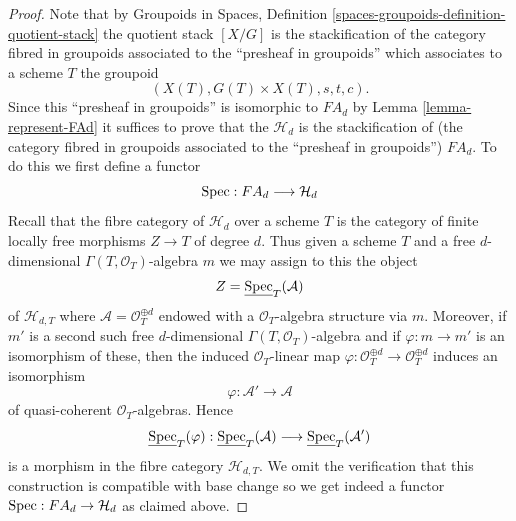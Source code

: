 \begin{proof}
Note that by
Groupoids in Spaces, Definition
\ref{spaces-groupoids-definition-quotient-stack}
the quotient stack $[X/G]$ is the stackification of the
category fibred in groupoids associated to the ``presheaf in groupoids''
which associates to a scheme $T$ the groupoid
$$
(X(T), G(T) \times X(T), s, t, c).
$$
Since this ``presheaf in groupoids'' is isomorphic to $FA_d$ by
Lemma \ref{lemma-represent-FAd}
it suffices to prove that the $\mathcal{H}_d$ is the stackification
of (the category fibred in groupoids associated to the
``presheaf in groupoids'') $FA_d$. To do this we first define a
functor
$$
\mathop{\mathrm{Spec}} : FA_d \longrightarrow \mathcal{H}_d
$$
Recall that the fibre category of $\mathcal{H}_d$ over a scheme $T$
is the category of finite locally free morphisms $Z \to T$ of degree $d$.
Thus given a scheme $T$ and a free $d$-dimensional
$\Gamma(T, \mathcal{O}_T)$-algebra $m$ we may assign to this the object
$$
Z = \underline{\mathop{\mathrm{Spec}}}_T(\mathcal{A})
$$
of $\mathcal{H}_{d, T}$
where $\mathcal{A} = \mathcal{O}_T^{\oplus d}$ endowed with a
$\mathcal{O}_T$-algebra structure via $m$. Moreover, if $m'$ is
a second such free $d$-dimensional $\Gamma(T, \mathcal{O}_T)$-algebra
and if $\varphi : m \to m'$ is an isomorphism of these, then
the induced $\mathcal{O}_T$-linear map
$\varphi : \mathcal{O}_T^{\oplus d} \to \mathcal{O}_T^{\oplus d}$
induces an isomorphism
$$
\varphi : \mathcal{A}' \longrightarrow \mathcal{A}
$$
of quasi-coherent $\mathcal{O}_T$-algebras. Hence
$$
\underline{\mathop{\mathrm{Spec}}}_T(\varphi) :
\underline{\mathop{\mathrm{Spec}}}_T(\mathcal{A})
\longrightarrow
\underline{\mathop{\mathrm{Spec}}}_T(\mathcal{A}')
$$
is a morphism in the fibre category $\mathcal{H}_{d, T}$. We omit the
verification that this construction is compatible with base change so
we get indeed a functor $\mathop{\mathrm{Spec}} : FA_d \to \mathcal{H}_d$
as claimed above.


\end{proof}
